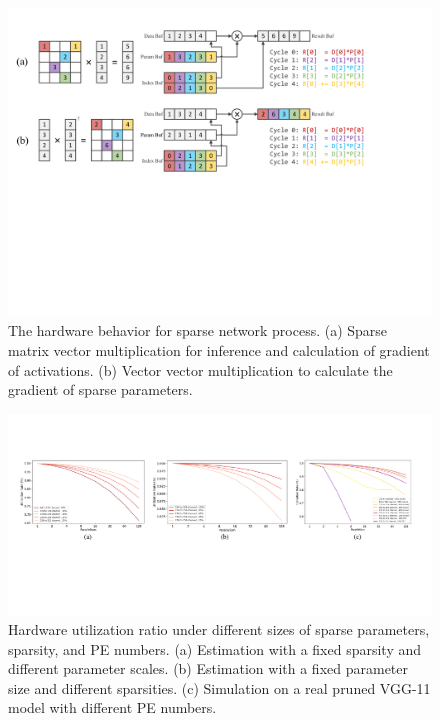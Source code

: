 \begin{figure}[htbp] 
  \centering
  \includegraphics[width=1.8\columnwidth]{figures/sparse_mv.pdf}
  \caption{The hardware behavior for sparse network process. (a) Sparse matrix vector multiplication for inference and calculation of gradient of activations. (b) Vector vector multiplication to calculate the gradient of sparse parameters. }
  \label{fig:spmv}
\end{figure}

\begin{figure}[t]
  \centering
  \includegraphics[width=1.8\columnwidth]{figures/utilization.pdf}
  \caption{Hardware utilization ratio under different sizes of sparse parameters, sparsity, and PE numbers. (a) Estimation with a fixed sparsity and different parameter scales. (b) Estimation with a fixed parameter size and different sparsities. (c) Simulation on a real pruned VGG-11 model with different PE numbers.}
  \label{fig:util_sim}
\end{figure}

